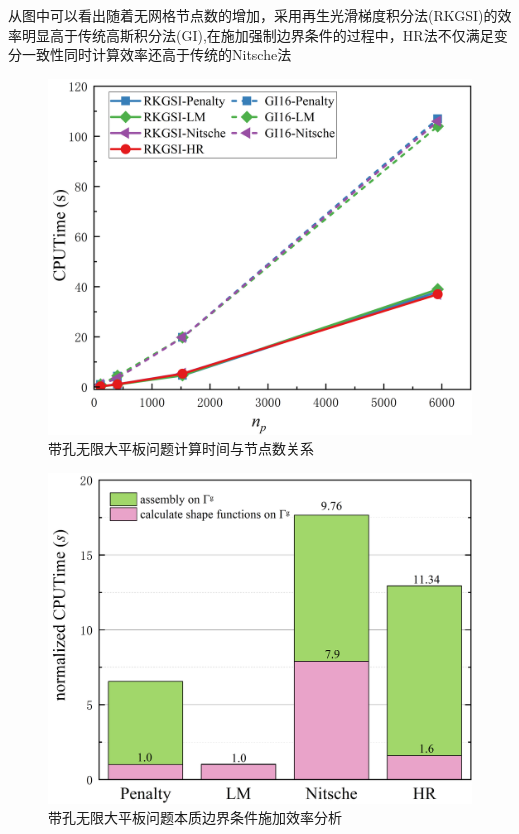 从图中可以看出随着无网格节点数的增加，采用再生光滑梯度积分法(RKGSI)的效率明显高于传统高斯积分法(GI),在施加强制边界条件的过程中，HR法不仅满足变分一致性同时计算效率还高于传统的Nitsche法
\begin{figure}[!h]
    \centering
    \includegraphics[scale=0.5]{figure/hole/CPUTime.png}
    \caption{带孔无限大平板问题计算时间与节点数关系}\label{HCPUTime}
\end{figure}
\begin{figure}[!h]
    \centering
    \includegraphics[scale=0.5]{figure/hole/caculate.png}
    \caption{带孔无限大平板问题本质边界条件施加效率分析}\label{Hcaculate}
\end{figure}\newpage
